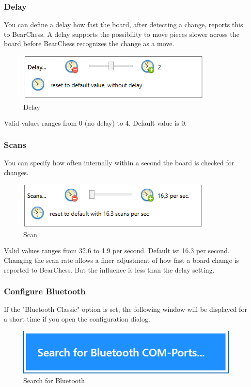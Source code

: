 \documentclass[11pt,a4paper]{article}
\begin{document}
\subsubsection{Delay}
You can define a delay how fast the board, after detecting a change, reports this to BearChess. A delay supports the possibility to move pieces slower across the board before BearChess recognizes the change as a move. \\
\begin{figure}[H]
	\centering
	\includegraphics[scale=1.0]{MillenniumChessLink11.png}
	\caption{Delay}
	\label{fig:MillenniumChessLink11}
\end{figure}
Valid values ranges from 0 (no delay) to 4. Default value is 0.


\subsubsection{Scans}
You can specify how often internally within a second the board is checked for changes.\\
\begin{figure}[H]
	\centering
	\includegraphics[scale=1.0]{MillenniumChessLink12.png}
	\caption{Scan}
	\label{fig:MillenniumChessLink12}
\end{figure}
Valid values ranges from 32.6 to 1.9 per second. Default ist 16.3 per second.
Changing the scan rate allows a finer adjustment of how fast a board change is reported to BearChess. But the influence is less than the delay setting.

\subsubsection{Configure Bluetooth} \label{Bluetooth}

If the "Bluetooth Classic" option is set, the following window will be displayed for a short time if you open the configuration dialog.

\begin{figure}[H]
	\centering
	\includegraphics[scale=0.8]{MillenniumChessLink10.png}
	\caption{Search for Bluetooth}
	\label{fig:MillenniumChessLink10}
\end{figure}
\end{document}
